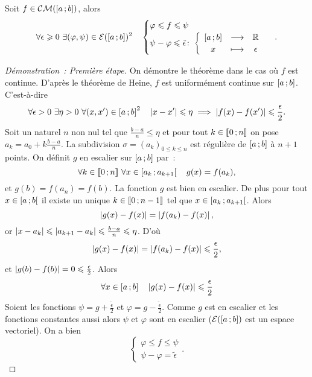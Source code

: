 \begin{theo}
  Soit \(f \in \mathcal{CM}(\left[ a \, ;  b \right])\), alors
  \begin{equation}
    \forall \epsilon \geqslant 0 \ \exists (\varphi, \psi) \in \mathcal{E}(\left[ a \, ;  b \right])^2 \quad \begin{cases} \varphi \leqslant f \leqslant \psi \\ \psi-\varphi \leqslant \tilde{\epsilon}\colon \left\{\begin{array}{ccc} \left[ a \, ;  b \right] & \longrightarrow &\mathbb{R}\\ x & \longmapsto & \epsilon \end{array} \right. \end{cases}.
  \end{equation}
\end{theo}
\begin{proof}[Démonstration~: Première étape]
  On démontre le théorème dans le cas où \(f\) est continue. D'après le théorème de Heine, \(f\) est uniformément continue sur \(\left[ a \, ;  b \right]\). C'est-à-dire
  \begin{equation}
    \forall \epsilon >0 \ \exists \eta>0 \ \forall (x,x') \in \intervalleff{a}{b}^2 \quad \abs{x-x'} \leqslant \eta \implies \abs{f(x)-f(x')} \leqslant \frac{\epsilon}{2}.
  \end{equation}
  Soit un naturel \(n\) non nul tel que \(\frac{b-a}{n} \leqslant \eta\) et pour tout \(k \in \mathopen{\llbracket}0\mathclose{}\mathpunct{};n\mathclose{\rrbracket}\) on pose \(a_k=a_0+k \frac{b-a}{n}\). La subdivision \(\sigma=(a_k)_{0 \leqslant k \leqslant n}\) est régulière de \(\left[ a \, ;  b \right]\) à \(n+1\) points. On définit \(g\) en escalier sur \(\left[ a \, ;  b \right]\) par~:
  \begin{equation}
    \forall k \in \mathopen{\llbracket}0\mathclose{}\mathpunct{};n\mathclose{\rrbracket} \ \forall x \in \left[ a_k \, ;  a_{k+1} \right[ \quad g(x)=f(a_k),
  \end{equation}
  et \(g(b)=f(a_n)=f(b)\). La fonction \(g\) est bien en escalier. De plus pour tout \(x \in \left[ a \, ;  b \right[\) il existe un unique \(k \in \mathopen{\llbracket}0\mathclose{}\mathpunct{};n-1\mathclose{\rrbracket}\) tel que \(x \in \left[ a_k \, ;  a_{k+1} \right[\).  Alors
  \begin{equation}
    \left\lvert g(x)-f(x)\right\rvert = \left\lvert f(a_k)-f(x)\right\rvert,
  \end{equation}
  or \(\left\lvert x-a_k\right\rvert \leqslant \left\lvert a_{k+1}-a_k\right\rvert \leqslant \frac{b-a}{n}\leqslant \eta\). D'où
  \begin{equation}
    \left\lvert g(x)-f(x)\right\rvert = \left\lvert f(a_k)-f(x)\right\rvert \leqslant \frac{\epsilon}{2},
  \end{equation}
  et \(\left\lvert g(b)-f(b)\right\rvert=0 \leqslant \frac{\epsilon}{2}\). Alors
  \begin{equation}
    \forall x \in \left[ a \, ;  b \right] \quad \left\lvert g(x)-f(x)\right\rvert \leqslant \frac{\epsilon}{2}
  \end{equation}
  Soient les fonctions \(\psi=g + \frac{\tilde{\epsilon}}{2}\) et \(\varphi=g - \frac{\tilde{\epsilon}}{2}\). Comme \(g\) est en escalier et les fonctions constantes aussi alors \(\psi\) et \(\varphi\) sont en escalier (\(\mathcal{E}(\left[ a \, ;  b \right])\) est un espace vectoriel). On a bien
  \begin{equation}
    \begin{cases}
      \varphi \leqslant f \leqslant \psi \\
      \psi-\varphi=\tilde{\epsilon}
    \end{cases}.
  \end{equation}


\end{proof}
